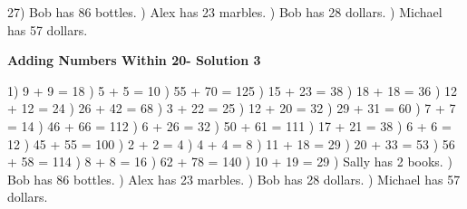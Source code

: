 \documentclass{article}%
\begin{document}
27) Bob has 86 bottles.%
) Alex has 23 marbles.%
) Bob has 28 dollars.%
) Michael has 57 dollars.%
\newline%
\newpage%
\large%
\begin{center}%
\textbf{Adding Numbers Within 20- Solution 3}%
\newline%
\end{center} \normalsize%
1) 9 + 9 = 18%
) 5 + 5 = 10%
) 55 + 70 = 125%
) 15 + 23 = 38%
) 18 + 18 = 36%
) 12 + 12 = 24%
) 26 + 42 = 68%
) 3 + 22 = 25%
) 12 + 20 = 32%
) 29 + 31 = 60%
) 7 + 7 = 14%
) 46 + 66 = 112%
) 6 + 26 = 32%
) 50 + 61 = 111%
) 17 + 21 = 38%
) 6 + 6 = 12%
) 45 + 55 = 100%
) 2 + 2 = 4%
) 4 + 4 = 8%
) 11 + 18 = 29%
) 20 + 33 = 53%
) 56 + 58 = 114%
) 8 + 8 = 16%
) 62 + 78 = 140%
) 10 + 19 = 29%
) Sally has 2 books.%
) Bob has 86 bottles.%
) Alex has 23 marbles.%
) Bob has 28 dollars.%
) Michael has 57 dollars.%
\newline%
\end{document}
